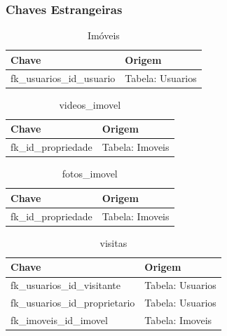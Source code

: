 \subsubsection{Chaves Estrangeiras}

\begin{table}[htbp]
    \centering
    \caption{Imóveis}
    \begin{tabular}{|p{8cm}|p{7cm}|} 
        \hline
        Chave & Origem\\
        \hline
        fk\_usuarios\_id\_usuario & Tabela: Usuarios\\
        \hline
    \end{tabular}
    \label{tab:Imoveis}
\end{table}

\begin{table}[htbp]
    \centering
    \caption{videos\_imovel}
    \begin{tabular}{|p{8cm}|p{7cm}|} 
        \hline
        Chave & Origem\\
        \hline
        fk\_id\_propriedade & Tabela: Imoveis\\
        \hline
    \end{tabular}
    \label{tab:Imoveis}
\end{table}

\begin{table}[htbp]
    \centering
    \caption{fotos\_imovel}
    \begin{tabular}{|p{8cm}|p{7cm}|} 
        \hline
        Chave & Origem\\
        \hline
        fk\_id\_propriedade & Tabela: Imoveis\\
        \hline
    \end{tabular}
    \label{tab:Imoveis}
\end{table}

\begin{table}[htbp]
    \centering
    \caption{visitas}
    \begin{tabular}{|p{8cm}|p{7cm}|} 
        \hline
        Chave & Origem\\
        \hline
        fk\_usuarios\_id\_visitante & Tabela: Usuarios\\
        \hline
        fk\_usuarios\_id\_proprietario & Tabela: Usuarios\\
        \hline
        fk\_imoveis\_id\_imovel & Tabela: Imoveis\\
        \hline
    \end{tabular}
    \label{tab:Imoveis}
\end{table}

